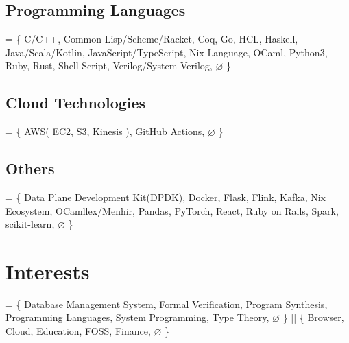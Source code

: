 \documentclass[10pt]{article}
\begin{document}
  \subsection*{Programming Languages}
    = \{
      C/C++,
      Common Lisp/Scheme/Racket,
      Coq,
      Go,
      HCL,
      Haskell,
      Java/Scala/Kotlin,
      JavaScript/TypeScript,
      Nix Language,
      OCaml,
      Python3,
      Ruby,
      Rust,
      Shell Script,
      Verilog/System Verilog,
      $\varnothing$
    \}
  \subsection*{Cloud Technologies}
    = \{
      AWS(
        EC2,
        S3,
        Kinesis
      ),
      GitHub Actions,
      $\varnothing$
    \}
  \subsection*{Others}
    = \{
      Data Plane Development Kit(DPDK),
      Docker,
      Flask,
      Flink,
      Kafka,
      Nix Ecosystem,
      OCamllex/Menhir,
      Pandas,
      PyTorch,
      React,
      Ruby on Rails,
      Spark,
      scikit-learn,
      $\varnothing$
    \}

\section*{Interests}
  = \{
    Database Management System,
    Formal Verification,
    Program Synthesis,
    Programming Languages,
    System Programming,
    Type Theory,
    $\varnothing$
  \}
  ||
  \{
    Browser,
    Cloud,
    Education,
    FOSS,
    Finance,
    $\varnothing$
  \}
\end{document}
